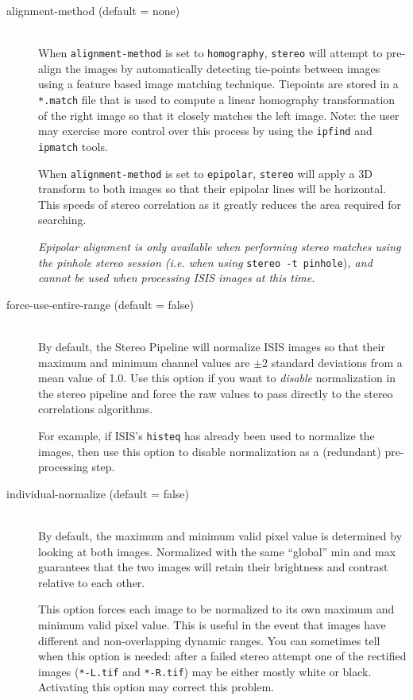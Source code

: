 \begin{description}

\item[alignment-method \textnormal (default = none)] \hfill \\
  When \texttt{alignment-method} is set to \texttt{homography},
  \texttt{stereo} will attempt to pre-align the images by
  automatically detecting tie-points between images using a feature
  based image matching technique. Tiepoints are stored in a
  \texttt{*.match} file that is used to compute a linear homography
  transformation of the right image so that it closely matches the
  left image.  Note: the user may exercise more control over this
  process by using the \texttt{ipfind} and \texttt{ipmatch} tools.

  When \texttt{alignment-method} is set to \texttt{epipolar},
  \texttt{stereo} will apply a 3D transform to both images so that
  their epipolar lines will be horizontal. This speeds of stereo
  correlation as it greatly reduces the area required for searching.

  {\em Epipolar alignment is only available when performing stereo
    matches using the pinhole stereo session (i.e. when using}
  \texttt{stereo -t pinhole}){\em, and cannot be used when processing
    ISIS images at this time.}

\item[force-use-entire-range \textnormal (default = false)] \hfill \\
  By default, the Stereo Pipeline will normalize ISIS images so that
  their maximum and minimum channel values are $\pm$2 standard
  deviations from a mean value of 1.0.  Use this option if you want to
  {\em disable} normalization in the stereo pipeline and force the raw
  values to pass directly to the stereo correlations algorithms.

  For example, if ISIS's \texttt{histeq} has already been used to
  normalize the images, then use this option to disable normalization
  as a (redundant) pre-processing step.


\item[individual-normalize \textnormal (default = false)] \hfill \\
  By default, the maximum and minimum valid pixel value is determined
  by looking at both images.  Normalized with the same ``global'' min
  and max guarantees that the two images will retain their brightness
  and contrast relative to each other.

  This option forces each image to be normalized to its own maximum
  and minimum valid pixel value. This is useful in the event that
  images have different and non-overlapping dynamic ranges. You can
  sometimes tell when this option is needed: after a failed stereo
  attempt one of the rectified images (\texttt{*-L.tif} and
  \texttt{*-R.tif}) may be either mostly white or black.  Activating
  this option may correct this problem.


\end{description}
